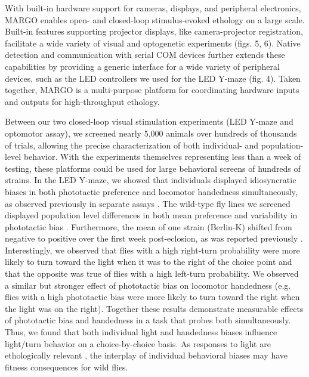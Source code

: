 \documentclass[10pt,letterpaper]{article}
\begin{document}
With built-in hardware support for cameras, displays, and peripheral electronics, MARGO enables open- and closed-loop stimulus-evoked ethology on a large scale. Built-in features supporting projector displays, like camera-projector registration, facilitate a wide variety of visual and optogenetic experiments (figs. 5, 6). Native detection and communication with serial COM devices further extends these capabilities by providing a generic interface for a wide variety of peripheral devices, such as the LED controllers we used for the LED Y-maze (fig. 4). Taken together, MARGO is a multi-purpose platform for coordinating hardware inputs and outputs for high-throughput ethology. 

Between our two closed-loop visual stimulation experiments (LED Y-maze and optomotor assay), we screened nearly 5,000 animals over hundreds of thousands of trials, allowing the precise characterization of both individual- and population-level behavior. With the experiments themselves representing less than a week of testing, these platforms could be used for large behavioral screens of hundreds of strains. In the LED Y-maze, we showed that individuals displayed idiosyncratic biases in both phototactic preference and locomotor handedness simultaneously, as observed previously in separate assays \cite{Kain_Phototactic_2012,Buchanan_Neuronal_2015}. The wild-type fly lines we screened displayed population level differences in both mean preference and variability in phototactic bias \cite{Ayroles_Behavioral_2015}. Furthermore, the mean of one strain (Berlin-K) shifted from negative to positive over the first week post-eclosion, as was reported previously \cite{Chiang_Tactic_1963}. Interestingly, we observed that flies with a high right-turn probability were more likely to turn toward the light when it was to the right of the choice point and that the opposite was true of flies with a high left-turn probability. We observed a similar but stronger effect of phototactic bias on locomotor handedness (e.g. flies with a high phototactic bias were more likely to turn toward the right when the light was on the right). Together these results demonstrate measurable effects of phototactic bias and handedness in a task that probes both simultaneously. Thus, we found that both individual light and handedness biases influence light/turn behavior on a choice-by-choice basis. As responses to light are ethologically relevant \cite{Kain_Variability_2015}, the interplay of individual behavioral biases may have fitness consequences for wild flies.
\end{document}

